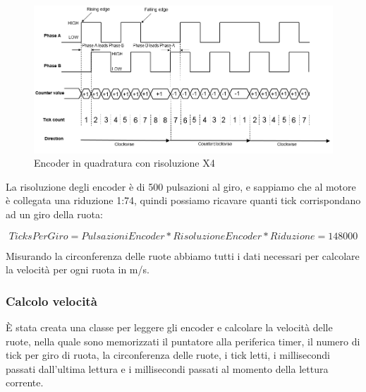 \begin{figure}[H]
    \centering
    \includegraphics[width=\textwidth]{images/x4_encoder.png}
    \caption{Encoder in quadratura con risoluzione X4}
    \label{fig:x4_encoder}
\end{figure}

La risoluzione degli encoder è di 500 pulsazioni al giro, e sappiamo che al motore è collegata una riduzione 1:74, quindi possiamo ricavare quanti tick corrispondano ad un giro della ruota:

\begin{displaymath}
TicksPerGiro = Pulsazioni Encoder * Risoluzione Encoder * Riduzione = 148000
\end{displaymath}

Misurando la circonferenza delle ruote abbiamo tutti i dati necessari per calcolare la velocità per ogni ruota in m/s.

\subsubsection{Calcolo velocità}

È stata creata una classe per leggere gli encoder e calcolare la velocità delle ruote, nella quale sono memorizzati il puntatore alla periferica timer, il numero di tick per giro di ruota, la circonferenza delle ruote, i tick letti, i millisecondi passati dall'ultima lettura e i millisecondi passati al momento della lettura corrente.

